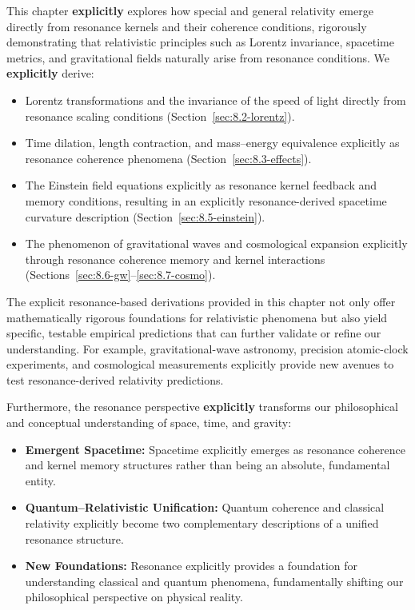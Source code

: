 This chapter \textbf{explicitly} explores how special and general relativity emerge directly from resonance kernels and their coherence conditions, rigorously demonstrating that relativistic principles such as Lorentz invariance, spacetime metrics, and gravitational fields naturally arise from resonance conditions.  We \textbf{explicitly} derive:
\begin{itemize}
  \item Lorentz transformations and the invariance of the speed of light directly from resonance scaling conditions (Section~\ref{sec:8.2-lorentz}).
  \item Time dilation, length contraction, and mass–energy equivalence explicitly as resonance coherence phenomena (Section~\ref{sec:8.3-effects}).
  \item The Einstein field equations explicitly as resonance kernel feedback and memory conditions, resulting in an explicitly resonance-derived spacetime curvature description (Section~\ref{sec:8.5-einstein}).
  \item The phenomenon of gravitational waves and cosmological expansion explicitly through resonance coherence memory and kernel interactions (Sections~\ref{sec:8.6-gw}–\ref{sec:8.7-cosmo}).
\end{itemize}

The explicit resonance-based derivations provided in this chapter not only offer mathematically rigorous foundations for relativistic phenomena but also yield specific, testable empirical predictions that can further validate or refine our understanding.  For example, gravitational-wave astronomy, precision atomic-clock experiments, and cosmological measurements explicitly provide new avenues to test resonance-derived relativity predictions.

Furthermore, the resonance perspective \textbf{explicitly} transforms our philosophical and conceptual understanding of space, time, and gravity:
\begin{itemize}
  \item \textbf{Emergent Spacetime:} Spacetime explicitly emerges as resonance coherence and kernel memory structures rather than being an absolute, fundamental entity.
  \item \textbf{Quantum–Relativistic Unification:} Quantum coherence and classical relativity explicitly become two complementary descriptions of a unified resonance structure.
  \item \textbf{New Foundations:} Resonance explicitly provides a foundation for understanding classical and quantum phenomena, fundamentally shifting our philosophical perspective on physical reality.
\end{itemize}

